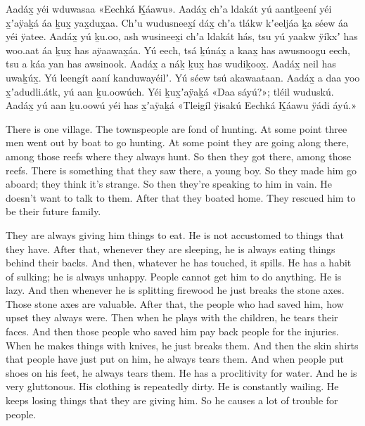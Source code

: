 \begin{pairs}
\begin{Leftside}
\pstart
{}Aadáx̱ yéi wduwasaa «\!Eechká Ḵáawu\!».
Aa\-dáx̱ chʼa ldakát yú aantḵeení yéi x̱ʼaÿaḵá áa ḵux̱ yax̱dux̱aa.
Chʼu wudusneex̱í dáx̱ chʼa tlákw kʼeeljáa ḵa séew áa yéi ÿatee.
Aadáx̱ yú ḵu.oo, ash wusineex̱i chʼa ldakát hás, tsu yú yaakw ÿíkxʼ has woo.aat
		áa ḵux̱ has aÿaawax̱áa.
Yú eech, tsá ḵúnáx̱ a kaax̱ has awusnoogu eech, tsu a káa yan has awsinook.
Aadáx̱ a náḵ ḵux̱ has wudiḵoox̱.
Aadáx̱ neil has uwaḵúx̱.
Yú leengít aaní kanduwayéilʼ.
Yú séew tsú akawaataan.
Aadáx̱ a daa yoo x̱ʼadudli.átk, yú aan ḵu.oowúch.
Yéi ḵux̱ʼaÿaḵá «\!Daa sáyú?\!»;
tléil wuduskú.
Aadáx̱ yú aan ḵu.oowú yéi has x̱ʼaÿaḵá
«\!Tleigíl ÿisakú Eechká Ḵáawu ÿádi áyú.\!»
\pend
\endnumbering
\end{Leftside}
\begin{Rightside}
\beginnumbering
\pstart\noindent
{}There is one village.
The townspeople are fond of hunting.
At some point three men went out by boat to go hunting.
At some point they are going along there, among those reefs where they always hunt.
So then they got there, among those reefs.
There is something that they saw there, a young boy.
So they made him go aboard;
they think it’s strange.
So then they’re speaking to him in vain.
He doesn’t want to talk to them.
After that they boated home.
They rescued him to be their future family.
\pend

\pstart
{}They are always giving him things to eat.
He is not accustomed to things that they have.
After that, whenever they are sleeping, he is always eating things behind their backs.
And then, whatever he has touched, it spills.
He has a habit of sulking;
he is always unhappy.
People cannot get him to do anything.
He is lazy.
And then whenever he is splitting firewood he just breaks the stone axes.
Those stone axes are valuable.
After that, the people who had saved him, how upset they always were.
Then when he plays with the children, he tears their faces.
And then those people who saved him pay back people for the injuries.
When he makes things with knives, he just breaks them.
And then the skin shirts that people have just put on him, he always tears them.
And when people put shoes on his feet, he always tears them.
He has a proclitivity for water.
And he is very gluttonous.
His clothing is repeatedly dirty.
He is constantly wailing.
He keeps losing things that they are giving him.
So he causes a lot of trouble for people.
\pend


\end{Rightside}
\end{pairs}
